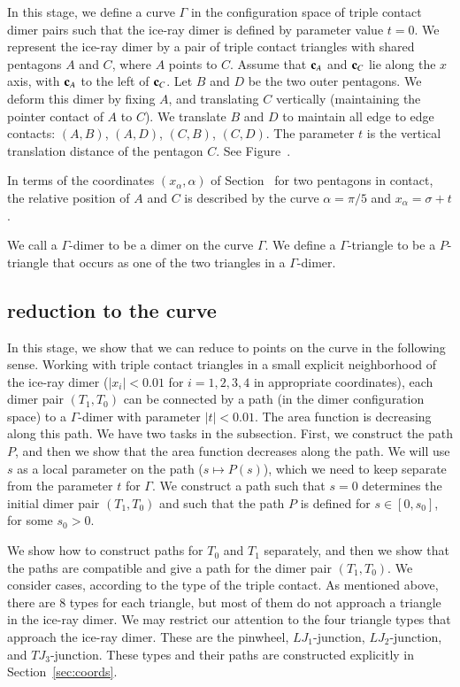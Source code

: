 In this stage, we define a curve $\Gamma$ in the configuration space
of triple contact dimer pairs such that the ice-ray dimer is defined
by parameter value $t=0$.  We represent the ice-ray dimer by a pair of
triple contact triangles with shared pentagons $A$ and $C$, where $A$
points to $C$.  Assume that ${\mathbf c}_A$ and ${\mathbf c}_C$ lie along the $x$ axis,
with ${\mathbf c}_A$ to the left of ${\mathbf c}_C$.  Let $B$ and $D$ be the two outer
pentagons.  We deform this dimer by fixing $A$, and translating $C$
vertically (maintaining the pointer contact of $A$ to $C$).  We
translate $B$ and $D$ to maintain all edge to edge contacts: $(A,B)$,
$(A,D)$, $(C,B)$, $(C,D)$.  The parameter $t$ is the vertical
translation distance of the pentagon $C$.  See
Figure~.


In terms of the coordinates $(x_\alpha,\alpha)$ of
Section~ for two pentagons in contact, the relative
position of $A$ and $C$ is described by the curve $\alpha=\pi/5$ and
$x_\alpha = \sigma+t$.

We call a $\Gamma$-dimer to be a dimer on the curve $\Gamma$.  We
define a $\Gamma$-triangle to be a $P$-triangle that occurs as one of
the two triangles in a $\Gamma$-dimer.


\subsection{reduction to the curve}

In this stage, we show that we can reduce to points on the curve in
the following sense.  Working with triple contact triangles in a small
explicit neighborhood of the ice-ray dimer ($|x_i|<0.01$ for
$i=1,2,3,4$ in appropriate coordinates), each dimer pair $(T_1,T_0)$
can be connected by a path (in the dimer configuration space) to a
$\Gamma$-dimer with parameter $|t|<0.01$.  The area function is
decreasing along this path.  We have two tasks in the subsection.
First, we construct the path $P$, and then we show that the area
function decreases along the path.  We will use $s$ as a local
parameter on the path ($s\mapsto P(s)$), which we need to keep
separate from the parameter $t$ for $\Gamma$.  We construct a path
such that $s=0$ determines the initial dimer pair $(T_1,T_0)$ and such
that the path $P$ is defined for $s\in [0,s_0]$, for some $s_0>0$.

We show how to construct paths for $T_0$ and $T_1$ separately, and
then we show that the paths are compatible and give a path for the
dimer pair $(T_1,T_0)$.  We consider cases, according to the type of
the triple contact.  As mentioned above, there are $8$ types for each
triangle, but most of them do not approach a triangle in the ice-ray
dimer.  We may restrict our attention to the four triangle types that
approach the ice-ray dimer.  These are the pinwheel, $LJ_1$-junction,
$LJ_2$-junction, and $TJ_3$-junction.  These types and their paths are
constructed explicitly in Section~\ref{sec:coords}.

